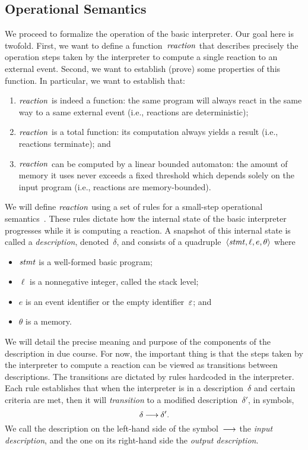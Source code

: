 \subsection{Operational Semantics}
\label{sec.sem.opsem}

We proceed to formalize the operation of the basic \CEU interpreter.  Our
goal here is twofold.  First, we want to define a function~$\mathop{\mathit{reaction}}$ that
describes precisely the operation steps taken by the interpreter to compute
a single reaction to an external event.  Second, we want to establish
(prove) some properties of this function.  In particular, we want to
establish that:
\begin{enumerate}
\item $\mathop{\mathit{reaction}}$ is indeed a function: the same program will always react
  in the same way to a same external event (i.e., reactions are
  deterministic);
\item $\mathop{\mathit{reaction}}$ is a total function: its computation always yields a
  result (i.e., reactions terminate); and
\item $\mathop{\mathit{reaction}}$ can be computed by a linear bounded automaton: the amount
  of memory it uses never exceeds a fixed threshold which depends solely on
  the input program (i.e., reactions are memory-bounded).
\end{enumerate}

We will define $\mathop{\mathit{reaction}}$ using a set of rules for a small-step operational
semantics~\cite{Plotkin-G-D-1981}.  These rules dictate how the internal
state of the basic \CEU interpreter progresses while it is computing a
reaction.  A snapshot of this internal state is called a \emph{description},
denoted~$\delta$, and consists of a quadruple~$\<\stmt,\ell,e,\theta>$ where
\begin{itemize}
\item $\mathit{stmt}$ is a well-formed basic \CEU program;
\item $\ell$ is a nonnegative integer, called the stack level;
\item $e$ is an event identifier or the empty identifier~$\varepsilon$;
  and
\item $\theta$ is a memory.
\end{itemize}

We will detail the precise meaning and purpose of the components of the
description in due course.  For now, the important thing is that the steps
taken by the interpreter to compute a reaction can be viewed as transitions
between descriptions.  The transitions are dictated by rules hardcoded in
the interpreter.  Each rule establishes that when the interpreter is in a
description~$\delta$ and certain criteria are met, then it will
\emph{transition} to a modified description~$\delta'$, in symbols,
\[
  \delta\trans\delta'.
\]
We call the description on the left-hand side of the symbol~$\trans$ the
\emph{input description}, and the one on its right-hand side the
\emph{output description}.


